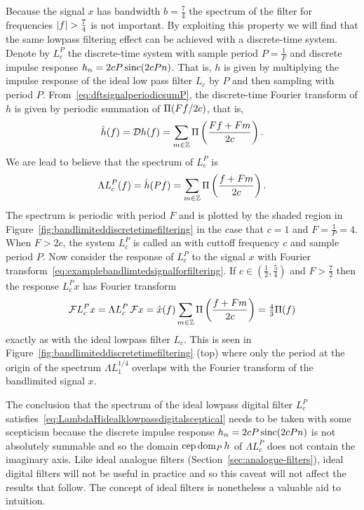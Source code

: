 Because the signal $x$ has bandwidth $b = \tfrac{7}{4}$ the spectrum of the filter for frequencies $\left\vert f \right\vert > \tfrac{7}{4}$ is not important.  By exploiting this property we will find that the same lowpass filtering effect can be achieved with a discrete-time system.  Denote by $L_{c}^P$ the discrete-time system with sample period $P = \tfrac{1}{F}$ and discrete impulse response $h_n = 2cP \operatorname{sinc}(2c Pn)$.  That is, $h$ is given by multiplying the impulse response of the ideal low pass filter $L_c$ by $P$ and then sampling with period $P$.  From~\eqref{eq:dftsignalperiodicsumP}, the discrete-time Fourier transform of $h$ is given by periodic summation of $\Pi(Ff/2c)$, that is,
\[
\hat{h}(f) = {\mathcal D} h(f) = \sum_{m \in {\mathbb Z}} \Pi\left( \frac{Ff + Fm}{2c}\right).
\] 
We are lead to believe that the spectrum of $L_c^P$ is
\begin{equation}\label{eq:LambdaHidealklowpassdigitalsceptical}
\Lambda L_c^P(f) = \hat{h}(Pf) = \sum_{m \in {\mathbb Z}} \Pi\left( \frac{f + Fm}{2c}\right).
\end{equation}
The spectrum is periodic with period $F$ and is plotted by the shaded region in Figure~\ref{fig:bandlimiteddiscretetimefiltering} in the case that $c = 1$ and $F = \tfrac{1}{P} = 4$.  When $F > 2c$, the system $L_c^P$ is called an  with cuttoff frequency $c$ and sample period $P$. Now consider the response of $L_c^P$ to the signal $x$ with Fourier transform~\ref{eq:examplebandlimtedsignalforfiltering}.  If $c \in (\tfrac{1}{2}, \tfrac{5}{4})$ and $F > \tfrac{7}{2}$ then the response $L_c^Px$ has Fourier transform
\[
{\mathcal F} L_c^P x = \Lambda L_c^P \, {\mathcal F} x = \hat{x}(f) \sum_{m \in {\mathbb Z}} \Pi\left( \frac{f + Fm}{2c}\right) = \tfrac{4}{3} \Pi(f)
\]
exactly as with the ideal lowpass filter $L_c$.  This is seen in Figure~\ref{fig:bandlimiteddiscretetimefiltering} (top) where only the period at the origin of the spectrum $\Lambda L_1^{1/4}$ overlaps with the Fourier transform of the bandlimited signal $x$.

The conclusion that the spectrum of the ideal lowpass digital filter $L_{c}^P$ satisfies~\eqref{eq:LambdaHidealklowpassdigitalsceptical} needs to be taken with some scepticism because the discrete impulse response $h_n = 2cP\operatorname{sinc}(2c P n)$ is not absolutely summable and so the domain $\operatorname{cep} \operatorname{dom}_P h$ of $\Lambda L_c^P$ does not contain the imaginary axis.  Like ideal analogue filters (Section~\ref{sec:analogue-filters}), ideal digital filters will not be useful in practice and so this caveat will not affect the results that follow. The concept of ideal filters is nonetheless a valuable aid to intuition.  


